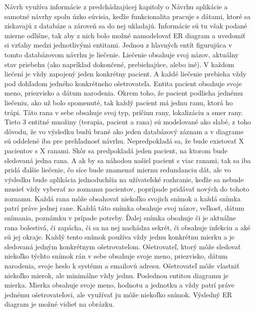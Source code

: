 Návrh využíva informácie  z predchádzajúcej kapitoly o Návrhu aplikácie a samotné návrhy spolu úzko súvisia, keďže funkcionalita pracuje s dátami, ktoré sa získavajú z databáze a zároveň sa do nej ukladajú. Informácie sú tu však podané mierne odlišne, tak aby z nich bolo možné namodelovať ER diagram a uvedomiť si vzťahy medzi jednotlivými entitami. Jednou z hlavných entít figurujúca v tomto databázovom návrhu je liečenie. Liečenie obsahuje svoj názov, aktuálny stav priebehu (ako napríklad dokončené, prebiehajúce, alebo iné). V každom liečení je vždy zapojený jeden konkrétny pacient. A každé liečenie prebieha vždy pod dohľadom jedného konkrétneho ošetrovateľa. Entita pacient obsahuje svoje meno, priezvisko a dátum narodenia. Okrem toho, že pacient podlieha jednému liečeniu, ako už bolo spomenuté, tak každý pacient má jednu ranu, ktorá ho trápi. Táto rana v sebe obsahuje svoj typ, príčinu rany, lokalizáciu a smer rany. Tieto 3 entitné množiny (terapia, pacient a rana) sú modelované ako slabé, z toho dôvodu, že vo výsledku budú brané ako jeden databázový záznam a v diagrame sú oddelené iba pre prehľadnosť návrhu. Nepredpokladá sa, že bude existovať X pacientov s X ranami. Skôr sa predpokladá jeden pacient, na ktorom bude sledovaná jedna rana. A ak by sa náhodou našiel pacient s viac ranami, tak sa iba pridá ďalšie liečenie, čo síce bude znamenať miernu redundanciu dát, ale vo výsledku bude aplikácia jednoduchšia na užívateľské rozhranie, keďže sa nebude musieť vždy vyberať zo zoznamu pacientov, poprípade pridávať nových do tohoto zoznamu. Každá rana môže obsahovať niekoľko svojich snímok a každá snímka patrí práve jednej rane. Každá táto snímka obsahuje svoj názov, veľkosť, dátum snímania, poznámku v prípade potreby. Ďalej snímka obsahuje či je aktuálne rana bolestivá, či zapácha, či sa na nej nachádza sekrét, či obsahuje infekciu a aké sú jej okraje. Každý tento snímok používa vždy jednu konkrétnu mierku a je sledovaná jedným konkrétnym ošetrovateľom. Ošetrovateľ, ktorý môže sledovať niekoľko týchto snímok rán v sebe obsahuje svoje meno, priezvisko, dátum narodenia, svoje heslo k systému a emailovú adresu. Ošetrovateľ môže vlastniť niekoľko mierok, ale minimálne vždy jednu. Poslednou entitou diagramu je mierka. Mierka obsahuje svoje meno, hodnotu a jednotku a vždy patrí práve jednému ošetrovateľovi, ale využívať ju môže niekoľko snímok. Výsledný ER diagram je možné vidieť na obrázku.
